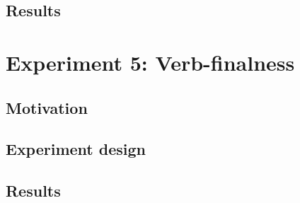 \subsection{Results}

\section{Experiment 5: Verb-finalness}
\subsection{Motivation}
\subsection{Experiment design}
\subsection{Results}